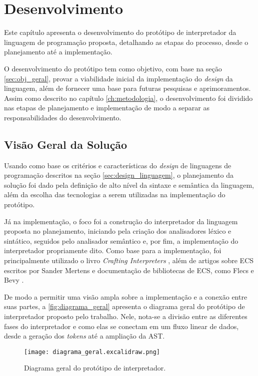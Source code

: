 \chapter{Desenvolvimento}\label{ch:desenvolvimento}

Este capítulo apresenta o desenvolvimento do protótipo de interpretador da linguagem de programação proposta, detalhando as etapas do processo, desde o planejamento até a implementação.

O desenvolvimento do protótipo tem como objetivo, com base na seção \ref{sec:obj_geral}, provar a viabilidade inicial da implementação do \textit{design} da linguagem, além de fornecer uma base para futuras pesquisas e aprimoramentos. Assim como descrito no capítulo \ref{ch:metodologia}, o desenvolvimento foi dividido nas etapas de planejamento e implementação de modo a separar as responsabilidades do desenvolvimento.

\section{Visão Geral da Solução}

Usando como base os critérios e características do \textit{design} de linguagens de programação descritos na seção \ref{sec:design_linguagem}, o planejamento da solução foi dado pela definição de alto nível da sintaxe e semântica da linguagem, além da escolha das tecnologias a serem utilizadas na implementação do protótipo.

Já na implementação, o foco foi a construção do interpretador da linguagem proposta no planejamento, iniciando pela criação dos analisadores léxico e sintático, seguidos pelo analisador semântico e, por fim, a implementação do interpretador propriamente dito. Como base para a implementação, foi principalmente utilizado o livro \textit{Crafting Interpreters} \cite{craftinginterpreters}, além de artigos sobre ECS escritos por Sander Mertens e documentação de bibliotecas de ECS, como Flecs \cite{flecs} e Bevy \cite{bevy}.

De modo a permitir uma visão ampla sobre a implementação e a conexão entre suas partes, a \autoref{fig:diagrama_geral} apresenta o diagrama geral do protótipo de interpretador proposto pelo trabalho. Nele, nota-se a divisão entre as diferentes fases do interpretador e como elas se conectam em um fluxo linear de dados, desde a geração dos \textit{tokens} até a ampliação da AST.

\begin{figure}[H]
	\centering
	\texttt{[image: diagrama\_geral.excalidraw.png]}
	\caption{Diagrama geral do protótipo de interpretador.}
	\label{fig:diagrama_geral}
\end{figure}

